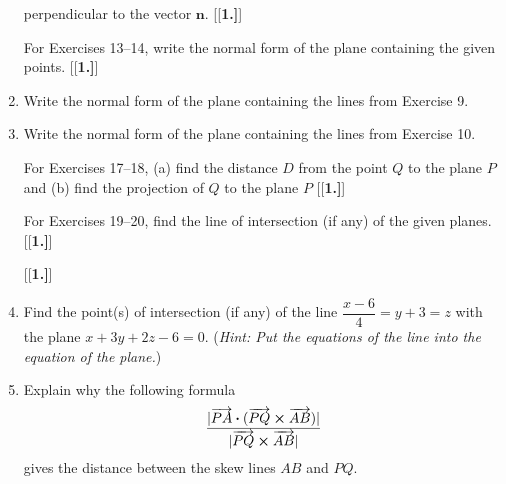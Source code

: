 \begin{enumerate}[\bfseries 1.]
perpendicular to the vector $\mathbf{n}$.
[{[\bfseries 1.]}]
\par\noindent For Exercises 13--14, write the normal form of the plane containing the given points.
[{[\bfseries 1.]}]
 \item Write the normal form of the plane containing the lines from Exercise 9.
 \item Write the normal form of the plane containing the lines from Exercise 10.
\par\noindent For Exercises 17--18, (a) find the distance $D$ from the point $Q$ to the plane $P$ and (b) find the projection of $Q$ to the plane $P$
[{[\bfseries 1.]}]
\par\noindent For Exercises 19--20, find the line of intersection (if any) of the given planes.
[{[\bfseries 1.]}]
[{[\bfseries 1.]}]
 \item Find the point(s) of intersection (if any) of the line $\dfrac{x - 6}{4} = y + 3 = z$ with the plane
 $x + 3y + 2z - 6 = 0$. (\emph{Hint: Put the equations of the line into the equation of the plane.})
\item Explain why the following formula 
\[\frac{|\overrightarrow{PA} \bm{\cdot} (\overrightarrow{PQ} \bm{\times} \overrightarrow{AB})|}{|{\overrightarrow{PQ} \bm{\times} \overrightarrow{AB}}|}\]
gives the distance between the skew lines $AB$ and $PQ$.
\end{enumerate}



